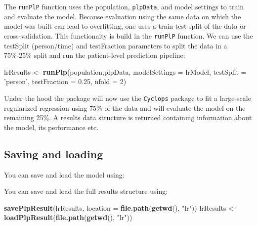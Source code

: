 \documentclass[]{article}
\newenvironment{Shaded}{\begin{snugshade}}{\end{snugshade}}
\newcommand{\KeywordTok}[1]{\textcolor[rgb]{0.13,0.29,0.53}{\textbf{#1}}}
\newcommand{\DataTypeTok}[1]{\textcolor[rgb]{0.13,0.29,0.53}{#1}}
\newcommand{\DecValTok}[1]{\textcolor[rgb]{0.00,0.00,0.81}{#1}}
\newcommand{\FloatTok}[1]{\textcolor[rgb]{0.00,0.00,0.81}{#1}}
\newcommand{\StringTok}[1]{\textcolor[rgb]{0.31,0.60,0.02}{#1}}
\newcommand{\OperatorTok}[1]{\textcolor[rgb]{0.81,0.36,0.00}{\textbf{#1}}}
\newcommand{\NormalTok}[1]{#1}
\begin{document}
The \texttt{runPlP} function uses the population, \texttt{plpData}, and
model settings to train and evaluate the model. Because evaluation using
the same data on which the model was built can lead to overfitting, one
uses a train-test split of the data or cross-validation. This
functionaity is build in the \texttt{runPlP} function. We can use the
testSplit (person/time) and testFraction parameters to split the data in
a 75\%-25\% split and run the patient-level prediction pipeline:

\begin{Shaded}
\begin{Highlighting}[]
\NormalTok{lrResults <-}\StringTok{ }\KeywordTok{runPlp}\NormalTok{(population,plpData, }\DataTypeTok{modelSettings =}\NormalTok{ lrModel, }\DataTypeTok{testSplit =} \StringTok{'person'}\NormalTok{,  }
\DataTypeTok{testFraction =} \FloatTok{0.25}\NormalTok{, }\DataTypeTok{nfold =} \DecValTok{2}\NormalTok{)}
\end{Highlighting}
\end{Shaded}

Under the hood the package will now use the \texttt{Cyclops} package to
fit a large-scale regularized regression using 75\% of the data and will
evaluate the model on the remaining 25\%. A results data structure is
returned containing information about the model, its performance etc.

\subsection{Saving and loading}\label{saving-and-loading}

You can save and load the model using:

\begin{Shaded}
\end{Shaded}

You can save and load the full results structure using:

\begin{Shaded}
\begin{Highlighting}[]
\KeywordTok{savePlpResult}\NormalTok{(lrResults, }\DataTypeTok{location =} \KeywordTok{file.path}\NormalTok{(}\KeywordTok{getwd}\NormalTok{(), }\StringTok{"lr"}\NormalTok{))}
\NormalTok{lrResults <-}\StringTok{ }\KeywordTok{loadPlpResult}\NormalTok{(}\KeywordTok{file.path}\NormalTok{(}\KeywordTok{getwd}\NormalTok{(), }\StringTok{"lr"}\NormalTok{))}
\end{Highlighting}
\end{Shaded}
\end{document}

